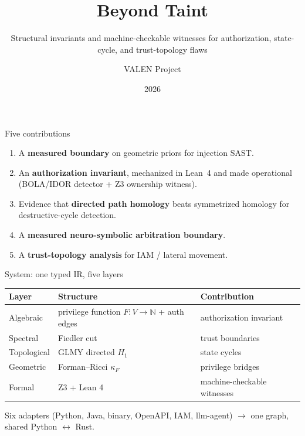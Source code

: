\documentclass[aspectratio=169,11pt]{beamer}
\title[VALEN]{Beyond Taint}
\subtitle{Structural invariants and machine-checkable witnesses for authorization,
state-cycle, and trust-topology flaws}
\author{VALEN Project}
\institute{Typed IR $\cdot$ Lean 4 $\cdot$ GLMY $\cdot$ Z3 witnesses}
\date{2026}
\newcommand{\N}{\mathbb{N}}
\begin{document}
\begin{frame}
  \titlepage
\end{frame}

\begin{frame}{Five contributions}
  \begin{enumerate}
    \item A \textbf{measured boundary} on geometric priors for injection SAST.
    \item An \textbf{authorization invariant}, mechanized in Lean~4 and made
          operational (BOLA/IDOR detector + Z3 ownership witness).
    \item Evidence that \textbf{directed path homology} beats symmetrized homology
          for destructive-cycle detection.
    \item A \textbf{measured neuro-symbolic arbitration boundary}.
    \item A \textbf{trust-topology analysis} for IAM / lateral movement.
  \end{enumerate}
\end{frame}

\begin{frame}{System: one typed IR, five layers}
  \begin{center}
  \begin{tabular}{lll}
  \toprule
  \textbf{Layer} & \textbf{Structure} & \textbf{Contribution} \\
  \midrule
  Algebraic & privilege function $F:V\to\N$ + auth edges & authorization invariant \\
  Spectral & Fiedler cut & trust boundaries \\
  Topological & GLMY directed $H_1$ & state cycles \\
  Geometric & Forman--Ricci $\kappa_F$ & privilege bridges \\
  Formal & Z3 + Lean 4 & machine-checkable witnesses \\
  \bottomrule
  \end{tabular}
  \end{center}
  Six adapters (Python, Java, binary, OpenAPI, IAM, llm-agent) $\to$ one graph,
  shared Python $\leftrightarrow$ Rust.
\end{frame}
\end{document}
